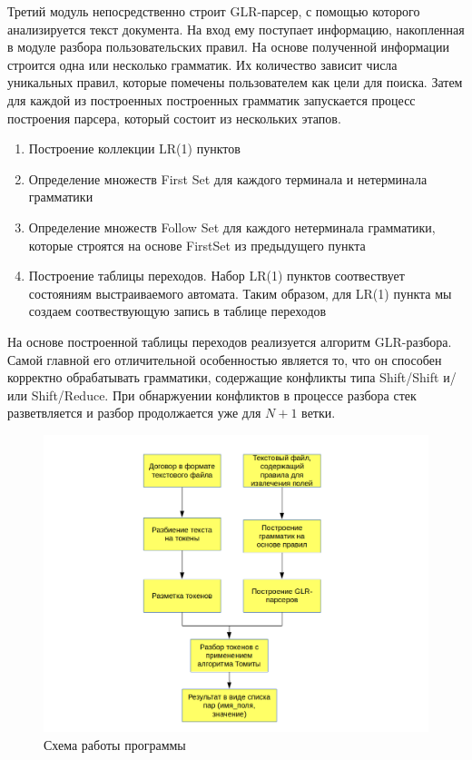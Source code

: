 Третий модуль непосредственно строит GLR-парсер, с помощью которого анализируется текст документа. На вход ему поступает информацию, накопленная в модуле разбора пользовательских правил. На основе полученной информации строится одна или несколько грамматик. Их количество зависит числа уникальных правил, которые помечены пользователем как цели для поиска. Затем для каждой из построенных построенных грамматик запускается процесс построения парсера, который состоит из нескольких этапов.
\begin{enumerate}
  \item Построение коллекции LR(1) пунктов
  \item Определение множеств First Set для каждого терминала и нетерминала грамматики
  \item Определение множеств Follow Set для каждого нетерминала грамматики, которые строятся на основе FirstSet из предыдущего пункта
  \item Построение таблицы переходов. Набор LR(1) пунктов соотвествует состояниям выстраиваемого автомата. Таким образом, для LR(1) пункта мы создаем соотвествующую запись в таблице переходов
\end{enumerate}
На основе построенной таблицы переходов реализуется алгоритм GLR-разбора. Самой главной его отличительной особенностью является то, что он способен корректно обрабатывать грамматики, содержащие конфликты типа Shift/Shift и/или Shift/Reduce. При обнаржуении конфликтов в процессе разбора стек разветвляется и разбор продолжается уже для $N+1$ ветки.

\begin{figure}%
\centering
\includegraphics[width=\textwidth]{img/ProjectDiagram.png}
\caption{\label{fig:project-diagram}Схема работы программы}
\label{fig:project-diagram}
\end{figure}

